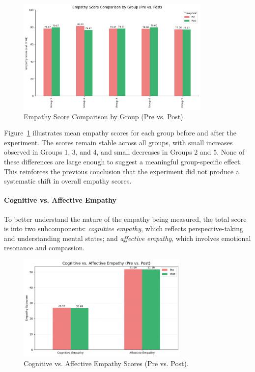 \begin{figure}[htbp]
    \centering
    \includegraphics[width=0.85\textwidth]{../../Figures/emph-scores-comp-grp.png}
    \caption{Empathy Score Comparison by Group (Pre vs. Post).}
    \label{fig:empathy_group_bar}
\end{figure}

\vspace{1em}

Figure~\ref{fig:empathy_group_bar} illustrates mean empathy scores for each group before and after the experiment. The scores remain stable across all groups, with small increases observed in Groups 1, 3, and 4, and small decreases in Groups 2 and 5. None of these differences are large enough to suggest a meaningful group-specific effect. This reinforces the previous conclusion that the experiment did not produce a systematic shift in overall empathy scores.

\paragraph{Cognitive vs. Affective Empathy}

To better understand the nature of the empathy being measured, the total score is into two subcomponents: \textit{cognitive empathy}, which reflects perspective-taking and understanding mental states; and \textit{affective empathy}, which involves emotional resonance and compassion.

\begin{figure}[htbp]
    \centering
    \includegraphics[width=0.75\textwidth]{../../Figures/cog-vs-affect.png}
    \caption{Cognitive vs. Affective Empathy Scores (Pre vs. Post).}
    \label{fig:empathy_cog_aff}
\end{figure}


